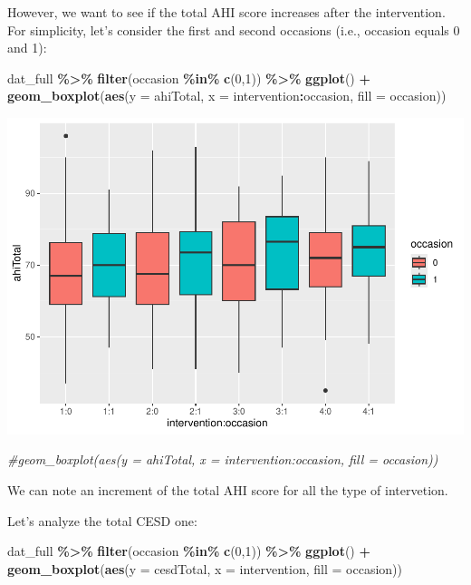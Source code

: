 \documentclass[
]{article}
\newenvironment{Shaded}{\begin{snugshade}}{\end{snugshade}}
\newcommand{\AttributeTok}[1]{\textcolor[rgb]{0.13,0.29,0.53}{#1}}
\newcommand{\CommentTok}[1]{\textcolor[rgb]{0.56,0.35,0.01}{\textit{#1}}}
\newcommand{\DecValTok}[1]{\textcolor[rgb]{0.00,0.00,0.81}{#1}}
\newcommand{\FunctionTok}[1]{\textcolor[rgb]{0.13,0.29,0.53}{\textbf{#1}}}
\newcommand{\NormalTok}[1]{#1}
\newcommand{\SpecialCharTok}[1]{\textcolor[rgb]{0.81,0.36,0.00}{\textbf{#1}}}
\begin{document}
However, we want to see if the total AHI score increases after the
intervention. For simplicity, let's consider the first and second
occasions (i.e., occasion equals 0 and 1):

\begin{Shaded}
\begin{Highlighting}[]
\NormalTok{dat\_full }\SpecialCharTok{\%\textgreater{}\%}
  \FunctionTok{filter}\NormalTok{(occasion }\SpecialCharTok{\%in\%} \FunctionTok{c}\NormalTok{(}\DecValTok{0}\NormalTok{,}\DecValTok{1}\NormalTok{)) }\SpecialCharTok{\%\textgreater{}\%}
  \FunctionTok{ggplot}\NormalTok{() }\SpecialCharTok{+}
  \FunctionTok{geom\_boxplot}\NormalTok{(}\FunctionTok{aes}\NormalTok{(}\AttributeTok{y =}\NormalTok{ ahiTotal, }\AttributeTok{x =}\NormalTok{ intervention}\SpecialCharTok{:}\NormalTok{occasion, }\AttributeTok{fill =}\NormalTok{ occasion))}
\end{Highlighting}
\end{Shaded}

\includegraphics{RealData_example_files/figure-latex/unnamed-chunk-9-1.pdf}

\begin{Shaded}
\begin{Highlighting}[]
  \CommentTok{\#geom\_boxplot(aes(y = ahiTotal, x = intervention:occasion, fill = occasion))}
\end{Highlighting}
\end{Shaded}

We can note an increment of the total AHI score for all the type of
intervetion.

Let's analyze the total CESD one:

\begin{Shaded}
\begin{Highlighting}[]
\NormalTok{dat\_full }\SpecialCharTok{\%\textgreater{}\%}
  \FunctionTok{filter}\NormalTok{(occasion }\SpecialCharTok{\%in\%} \FunctionTok{c}\NormalTok{(}\DecValTok{0}\NormalTok{,}\DecValTok{1}\NormalTok{)) }\SpecialCharTok{\%\textgreater{}\%}
  \FunctionTok{ggplot}\NormalTok{() }\SpecialCharTok{+}
  \FunctionTok{geom\_boxplot}\NormalTok{(}\FunctionTok{aes}\NormalTok{(}\AttributeTok{y =}\NormalTok{ cesdTotal, }\AttributeTok{x =}\NormalTok{ intervention, }\AttributeTok{fill =}\NormalTok{ occasion))}
\end{Highlighting}
\end{Shaded}
\end{document}
